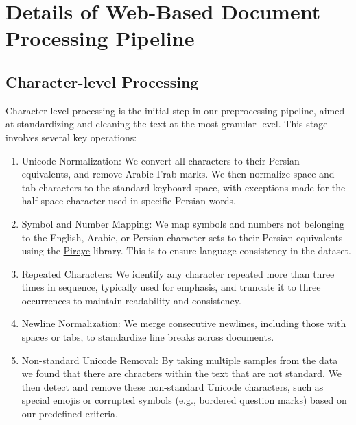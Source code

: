 \section{Details of Web-Based Document Processing Pipeline}
\label{sec:appendixA}
\subsection{Character-level Processing}
Character-level processing is the initial step in our preprocessing pipeline, aimed at standardizing and cleaning the text at the most granular level. This stage involves several key operations:

\begin{enumerate}
    \item Unicode Normalization: We convert all characters to their Persian equivalents, and remove Arabic I'rab marks. We then normalize space and tab characters to the standard keyboard space, with exceptions made for the half-space character used in specific Persian words.
    
    \item Symbol and Number Mapping: We map symbols and numbers not belonging to the English, Arabic, or Persian character sets to their Persian equivalents using the \href{https://github.com/arushadev/piraye}{Piraye} library. This is to ensure language consistency in the dataset.
    
    \item Repeated Characters: We identify any character repeated more than three times in sequence, typically used for emphasis, and truncate it to three occurrences to maintain readability and consistency.
    
    \item Newline Normalization: We merge consecutive newlines, including those with spaces or tabs, to standardize line breaks across documents.
    
    \item Non-standard Unicode Removal: By taking multiple samples from the data we found that there are chracters within the text that are not standard. We then detect and remove these non-standard Unicode characters, such as special emojis or corrupted symbols (e.g., bordered question marks) based on our predefined criteria. 
\end{enumerate}

